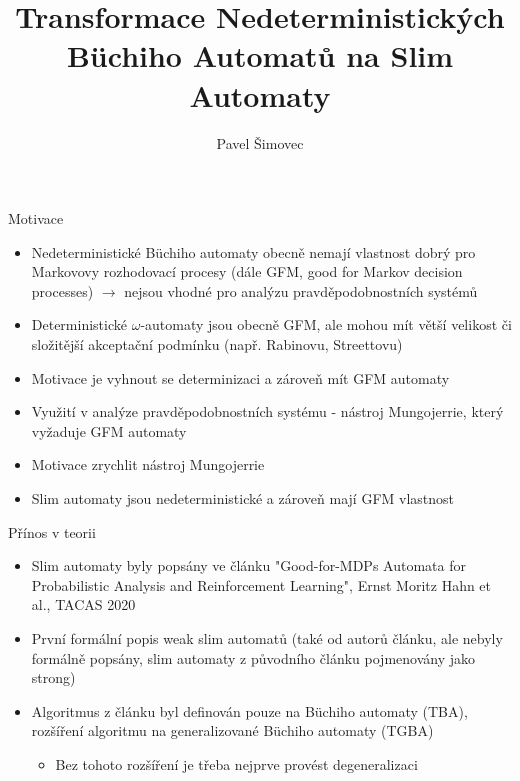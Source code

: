 \documentclass[
]{beamer}
\title[Slim Automata]{Transformace Nedeterministických Büchiho Automatů na Slim Automaty}
\author[P. Šimovec]{Pavel Šimovec\texorpdfstring{\\}{, }}
\institute[FI MU]{Fakulta Informatiky, Masarykova Univerzita}
\date{\formatdate{30}{6}{2021}}
\begin{document}
	
	\begin{frame}
		\maketitle
	\end{frame}
	



	\begin{frame}{Motivace}
		\begin{itemize}
			\pause
			\item Nedeterministické Büchiho automaty obecně nemají vlastnost \alert{dobrý pro Markovovy rozhodovací procesy} (dále \alert{GFM}, good for Markov decision processes) $\rightarrow$ nejsou vhodné pro analýzu pravděpodobnostních systémů
			\pause
			\item Deterministické $\omega$-automaty jsou obecně GFM, ale mohou mít větší velikost či složitější akceptační podmínku (např. Rabinovu, Streettovu)
			\pause
			\item Motivace je vyhnout se determinizaci a zároveň mít GFM automaty
			\pause
			\item Využití v analýze pravděpodobnostních systému - nástroj \alert{Mungojerrie}, který vyžaduje GFM automaty
			\pause
			\item Motivace zrychlit nástroj Mungojerrie
			\pause
			\item Slim automaty jsou nedeterministické a zároveň mají GFM vlastnost
		\end{itemize}
	\end{frame}

	\begin{frame}{Přínos v teorii}
		\begin{itemize}
			\pause
			\item Slim automaty byly popsány ve článku "Good-for-MDPs Automata for Probabilistic Analysis and Reinforcement
			Learning", Ernst Moritz Hahn et al., TACAS 2020
			\pause
			\item První formální popis \alert{weak slim automatů} (také od autorů článku, ale nebyly formálně popsány, slim automaty z původního článku pojmenovány jako \alert{strong})
			\pause
			\item Algoritmus z článku byl definován pouze na Büchiho automaty (TBA), rozšíření algoritmu na \alert{generalizované} Büchiho automaty (TGBA)
			\pause
			\begin{itemize}
			\item Bez tohoto rozšíření je třeba nejprve provést degeneralizaci
			\end{itemize}
			
		\end{itemize}
	
	
	\end{frame}
	
\end{document}
